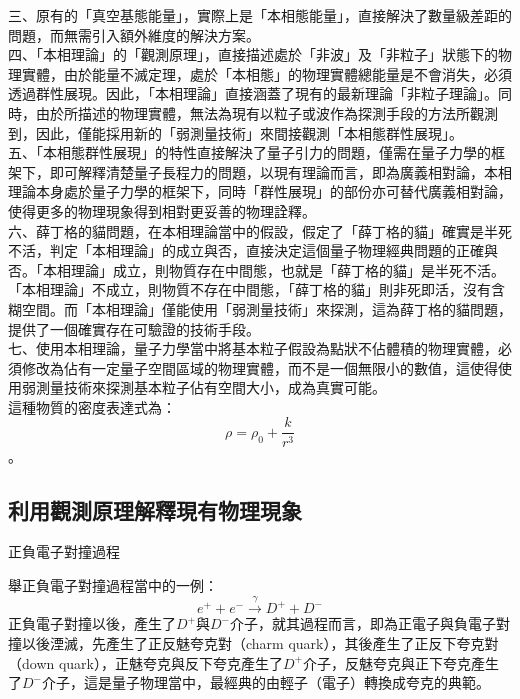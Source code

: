\documentclass[a4paper,notitlepage,UTF8]{ctexart}
\begin{document}
三、原有的「真空基態能量」，實際上是「本相態能量」，直接解決了數量級差距的問題，而無需引入額外維度的解決方案。
\\

四、「本相理論」的「觀測原理」，直接描述處於「非波」及「非粒子」狀態下的物理實體，由於能量不滅定理，處於「本相態」的物理實體總能量是不會消失，必須透過群性展現。因此，「本相理論」直接涵蓋了現有的最新理論「非粒子理論」。同時，由於所描述的物理實體，無法為現有以粒子或波作為探測手段的方法所觀測到，因此，僅能採用新的「弱測量技術」來間接觀測「本相態群性展現」。
\\

五、「本相態群性展現」的特性直接解決了量子引力的問題，僅需在量子力學的框架下，即可解釋清楚量子長程力的問題，以現有理論而言，即為廣義相對論，本相理論本身處於量子力學的框架下，同時「群性展現」的部份亦可替代廣義相對論，使得更多的物理現象得到相對更妥善的物理詮釋。
\\

六、薛丁格的貓問題，在本相理論當中的假設，假定了「薛丁格的貓」確實是半死不活，判定「本相理論」的成立與否，直接決定這個量子物理經典問題的正確與否。「本相理論」成立，則物質存在中間態，也就是「薛丁格的貓」是半死不活。「本相理論」不成立，則物質不存在中間態，「薛丁格的貓」則非死即活，沒有含糊空間。而「本相理論」僅能使用「弱測量技術」來探測，這為薛丁格的貓問題，提供了一個確實存在可驗證的技術手段。
\\

七、使用本相理論，量子力學當中將基本粒子假設為點狀不佔體積的物理實體，必須修改為佔有一定量子空間區域的物理實體，而不是一個無限小的數值，這使得使用弱測量技術來探測基本粒子佔有空間大小，成為真實可能。
\\
這種物質的密度表達式為：$$ \rho = \rho_{0} + \frac{k}{r^3} $$。
\\

\subsection{利用觀測原理解釋現有物理現象}

正負電子對撞過程

舉正負電子對撞過程當中的一例：
\begin{equation}
e^+ + e^- \xrightarrow{\gamma} D^+ + D^-
\end{equation}
正負電子對撞以後，產生了$D^+$與$D^-$介子，就其過程而言，即為正電子與負電子對撞以後湮滅，先產生了正反魅夸克對（charm quark），其後產生了正反下夸克對（down quark），正魅夸克與反下夸克產生了$D^+$介子，反魅夸克與正下夸克產生了$D^-$介子，這是量子物理當中，最經典的由輕子（電子）轉換成夸克的典範。
\end{document}
